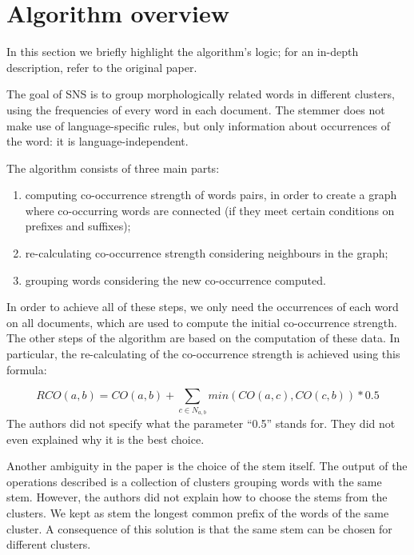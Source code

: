 \section{Algorithm overview}
    In this section we briefly highlight the algorithm's logic; for an in-depth description, refer to the original paper\cite{sns}.
 
    The goal of SNS is to group morphologically related words in different clusters, using the frequencies of every word in each document. The stemmer does not make use of language-specific rules, but only information about occurrences of the word: it is language-independent.
    
The algorithm consists of three main parts:

    \begin{enumerate}
        \item computing co-occurrence strength of words pairs, in order to create a graph where co-occurring words are connected (if they meet certain conditions on prefixes and suffixes);
        \item re-calculating co-occurrence strength considering neighbours in the graph;
        \item grouping words considering the new co-occurrence computed.
    \end{enumerate}

    In order to achieve all of these steps, we only need the occurrences of each word on all documents, which are used to compute the initial co-occurrence strength. The other steps of the algorithm are based on the computation of these data. In particular, the re-calculating of the co-occurrence strength is achieved using this formula:
    
    \begin{equation}
		RCO(a,b) = CO(a,b) + \sum_{c \in N_{a,b}}min(CO(a,c), CO(c, b)) * 0.5    
    \end{equation}
    The authors did not specify what the parameter ``0.5'' stands for. They did not even explained why it is the best choice.
    
Another ambiguity in the paper is the choice of the stem itself. The output of the operations described is a collection of clusters grouping words with the same stem. However, the authors did not explain how to choose the stems from the clusters. We kept as stem the longest common prefix of the words of the same cluster. A consequence of this solution is that the same stem can be chosen for different clusters.